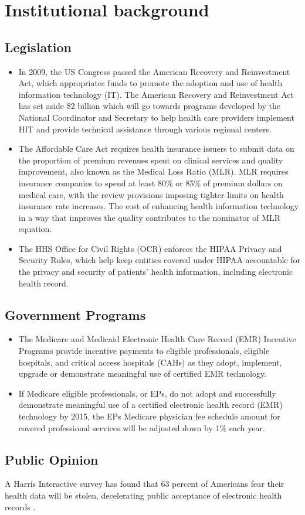 \section{Institutional background}
\subsection{Legislation}
\begin{itemize}
\item In 2009, the US Congress passed the American Recovery and Reinvestment Act, which appropriates funds to promote the adoption and use of health information technology (IT). The American Recovery and Reinvestment Act has set aside \$2 billion which will go towards programs developed by the National Coordinator and Secretary to help health care providers implement HIT and provide technical assistance through various regional centers.
\item The Affordable Care Act requires health insurance issuers to submit data on the proportion of premium revenues spent on clinical services and quality improvement, also known as the Medical Loss Ratio (MLR). MLR requires insurance companies to spend at least 80\% or 85\% of premium dollars on medical care, with the review provisions imposing tighter limits on health insurance rate increases. The cost of enhancing health information technology in a way that improves the quality contributes to the nominator of MLR equation.
\item  The HHS Office for Civil Rights (OCR) enforces the HIPAA Privacy and Security Rules, which help keep entities covered under HIPAA accountable for the privacy and security of patients' health information, including electronic health record.
\end{itemize}

\subsection{Government Programs}
\begin{itemize}
\item The Medicare and Medicaid Electronic Health Care Record (EMR) Incentive Programs provide incentive payments to eligible professionals, eligible hospitals, and critical access hospitals (CAHs) as they adopt, implement, upgrade or demonstrate meaningful use of certified EMR technology.
\item If Medicare eligible professionals, or EPs, do not adopt and successfully demonstrate meaningful use of a certified electronic health record (EMR) technology by 2015, the EPs Medicare physician fee schedule amount for covered professional services will be adjusted down by 1\% each year.
\end{itemize}

\subsection{Public Opinion}
A Harris Interactive survey has found that 63 percent of Americans fear their health data will be stolen, decelerating public acceptance of electronic health records \citep{Kaiser2012}.

